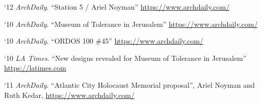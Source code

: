 \begin{tablist}
    \item[`12] \tab \textit{ArchDaily}. \enquote{Station 5 / Ariel Noyman}
    \href{https://www.archdaily.com/117870/station-5-ariel-noyman}{https://www.archdaily.com/}

    \item[`10] \tab \textit{ArchDaily}. \enquote{Museum of Tolerance in Jerusalem}
    \href{https://www.archdaily.com/81319/museum-of-tolerance-in-jerusalem-chyutin-architects}{https://www.archdaily.com/}

    \item[`10] \tab \textit{ArchDaily}. \enquote{ORDOS 100 \#45}
    \href{https://www.archdaily.com/32535/ordos-100-45-efrat-kowalsky-architects}{https://www.archdaily.com/}

    \item[`10] \tab \textit{LA Times}. \enquote{New designs revealed for Museum of Tolerance in Jerusalem}
    \href{https://latimesblogs.latimes.com/culturemonster/2010/09/simon-wiesenthal-center-unveils-new-designs-for-museum-of-tolerance-in-jerusalem-.html}{https://latimes.com}


    \item[`11] \tab \textit{ArchDaily}. \enquote{Atlantic City Holocaust Memorial proposal}, Ariel Noyman and Ruth Kedar,
    \href{https://www.archdaily.com/92128/atlantic-city-holocaust-memorial-proposal-ariel-noyman-and-ruth-kedar}{https://www.archdaily.com/}


\end{tablist}

